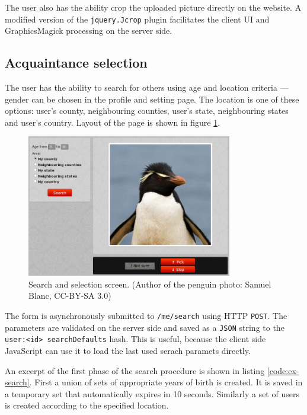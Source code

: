 \documentclass[12pt,oneside]{fithesis}
\begin{document}
		The user also has the ability crop the uploaded picture directly on the website. A modified version of the \texttt{jquery.Jcrop} plugin facilitates the client UI and GraphicsMagick processing on the server side.
		
	\subsection{Acquaintance selection}
		The user has the ability to search for others using age and location criteria --- gender can be chosen in the profile and setting page. The location is one of these options: user's county, neighbouring counties, user's state, neighbouring states and user's country. Layout of the page is shown in figure \ref{fig:screen-search}.
		\begin{figure}[h]
	  \centering
	    \includegraphics[width=0.8\textwidth]{screen-search.png}
		  \caption{Search and selection screen. (Author of the penguin photo: Samuel Blanc, CC-BY-SA 3.0)}
		  \label{fig:screen-search}
	  \end{figure}
	  
		The form is asynchronously submitted to \texttt{/me/search} using HTTP \texttt{POST}. The parameters are validated on the server side and saved as a \texttt{JSON} string to the \texttt{user:<id> searchDefaults} hash. This is useful, because the client side JavaScript can use it to load the last used serach paramets directly.
		
		An excerpt of the first phase of the search procedure is shown in listing \ref{code:ex-search}. First a union of sets of appropriate years of birth is created. It is saved in a temporary set that automatically expires in 10 seconds. Similarly a set of users is created according to the specified location.
		
		\begin{program}[h]
		\caption{An excerpt of the search procedure --- first phase}
		\label{code:ex-search}
		\inputminted[fontsize=\footnotesize, linenos=false, gobble=6]{javascript}{ex-search.js}
		\end{program}
\end{document}
